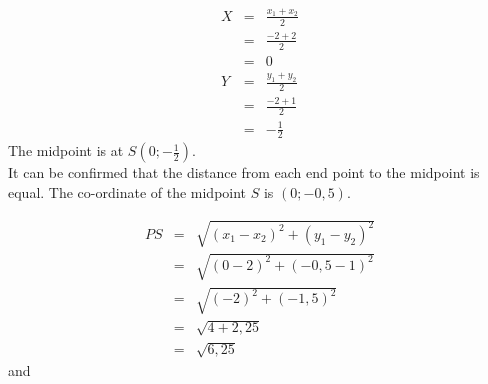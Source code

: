     \begin{eqnarray*}
 X & = & \frac{{x}_{1} + {x}_{2}}{2} \\ 
& = & \frac{-2 + 2}{2} \\ 
& = & 0 \\ 
Y & = & \frac{{y}_{1} + {y}_{2}}{2} \\ 
& = & \frac{-2 + 1}{2} \\ 
& = & -\frac{1}{2} 
      \end{eqnarray*}
The midpoint is at $S(0;-\frac{1}{2})$. \\ \pagebreak
        \label{m39119*id69058}It can be confirmed that the distance from each end point to the midpoint is equal. The co-ordinate of the midpoint $S$ is $(0;-0,5)$.\par 
        \label{m39119*id69097}\nopagebreak\noindent{}
          
    \begin{eqnarray*}
PS & = & \sqrt{{({x}_{1} - {x}_{2})}^{2} + {({y}_{1} - {y}_{2})}^{2}} \\ 
& = & \sqrt{{(0 - 2)}^{2} + {(-0,5 - 1)}^{2}} \\ 
& = & \sqrt{{(-2)}^{2} + {(-1,5)}^{2}} \\ 
& = & \sqrt{4 + 2,25} \\ 
& = & \sqrt{6,25}
      \end{eqnarray*}
        \label{m39119*id69323}and\par 
        \label{m39119*id69326}\nopagebreak\noindent{}
          
